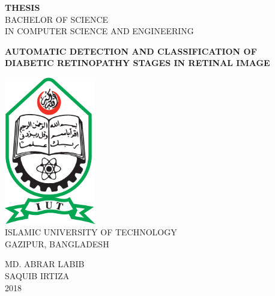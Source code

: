 \documentclass[12pt]{report}
\begin{document}
\begin{titlepage}
    \begin{center}
        \Large
        \textbf{THESIS}\\
        \normalsize
        BACHELOR OF SCIENCE\\
        IN COMPUTER SCIENCE AND ENGINEERING \\
        \vspace{1.0cm}
        
        \textbf{AUTOMATIC DETECTION AND CLASSIFICATION OF DIABETIC RETINOPATHY STAGES IN RETINAL IMAGE}

        \vspace{2.0cm}
        \includegraphics[width=0.3\textwidth]{iut}\\
        \vspace{1.0cm}
        ISLAMIC UNIVERSITY OF TECHNOLOGY\\
        GAZIPUR, BANGLADESH\\
        \vspace{3cm}
        
        
        MD. ABRAR LABIB\\
        \vspace{0.3cm}
        SAQUIB IRTIZA\\
        \vspace{0.5cm}
        2018\\
        \vspace{2.0cm}
        
        
       
        
        
    \end{center}
\end{titlepage}
\end{document}
